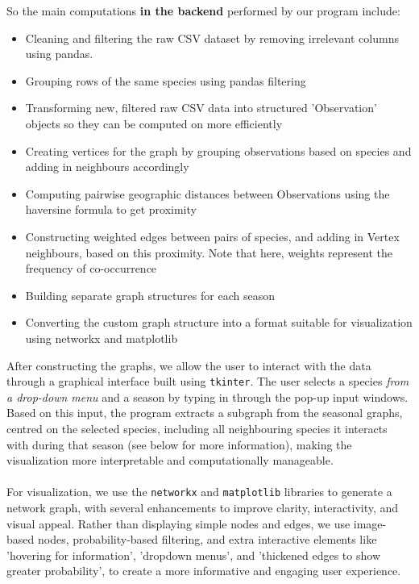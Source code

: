 \documentclass{article}
\begin{document}
So the main computations \textbf{in the backend} performed by our program include:
\begin{itemize}
    \item Cleaning and filtering the raw CSV dataset by removing irrelevant columns using pandas.
    \item Grouping rows of the same species using pandas filtering
    \item Transforming new, filtered raw CSV data into structured 'Observation' objects so they can be computed on more efficiently
    \item Creating vertices for the graph by grouping observations based on species and adding in neighbours accordingly
    \item Computing pairwise geographic distances between Observations using the haversine formula to get proximity
    \item Constructing weighted edges between pairs of species, and adding in Vertex neighbours, based on this proximity. Note that here, weights represent the frequency of co-occurrence
    \item Building separate graph structures for each season 
    \item Converting the custom graph structure into a format suitable for visualization using networkx and matplotlib
\end{itemize} 
After constructing the graphs, we allow the user to interact with the data through a graphical interface built using \texttt{tkinter}. The user selects a species \textit{from a drop-down menu} and a season by typing in through the pop-up input windows. Based on this input, the program extracts a subgraph from the seasonal graphs, centred on the selected species, including all neighbouring species it interacts with during that season (see below for more information), making the visualization more interpretable and computationally manageable. \\ \\
For visualization, we use the \texttt{networkx} and \texttt{matplotlib} libraries to generate a network graph, with several enhancements to improve clarity, interactivity, and visual appeal. Rather than displaying simple nodes and edges, we use image-based nodes, probability-based filtering, and extra interactive elements like 'hovering for information', 'dropdown menus', and 'thickened edges to show greater probability', to create a more informative and engaging user experience. \\ \\
\end{document}
